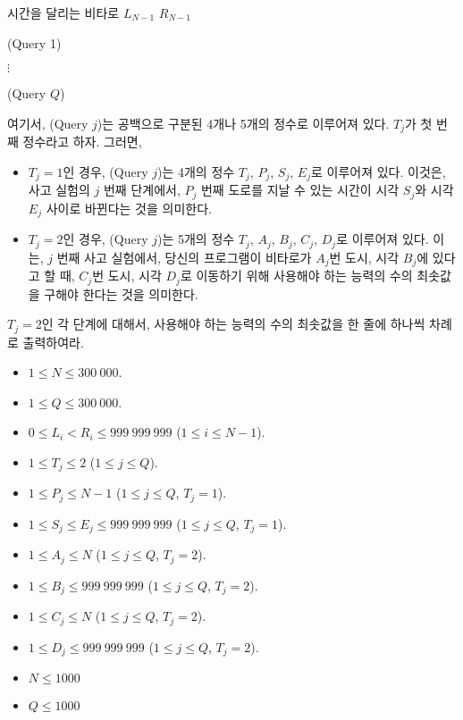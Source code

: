 \begin{problem}{시간을 달리는 비타로}
	$L_{N-1}$ $R_{N-1}$
	
	(Query 1)
	
	$\vdots$
	
	(Query $Q$)
	
	여기서, (Query $j$)는 공백으로 구분된 4개나 5개의 정수로 이루어져 있다. $T_j$가 첫 번째 정수라고 하자. 그러면,
	
	\begin{itemize}
		\item $T_j=1$인 경우, (Query $j$)는 4개의 정수 $T_j$, $P_j$, $S_j$, $E_j$로 이루어져 있다. 이것은, 사고 실험의 $j$ 번째 단계에서, $P_j$ 번째 도로를 지날 수 있는 시간이 시각 $S_j$와 시각 $E_j$ 사이로 바뀐다는 것을 의미한다.
		\item $T_j=2$인 경우, (Query $j$)는 5개의 정수 $T_j$, $A_j$, $B_j$, $C_j$, $D_j$로 이루어져 있다. 이는, $j$ 번째 사고 실험에서, 당신의 프로그램이 비타로가 $A_j$번 도시, 시각 $B_j$에 있다고 할 때, $C_j$번 도시, 시각 $D_j$로 이동하기 위해 사용해야 하는 능력의 수의 최솟값을 구해야 한다는 것을 의미한다.
	\end{itemize}
	
	\OutputFile
	
	$T_j=2$인 각 단계에 대해서, 사용해야 하는 능력의 수의 최솟값을 한 줄에 하나씩 차례로 출력하여라.
	
	\Constraints
	
	\begin{itemize}
		
		\item $1 \le N \le 300\ 000$.
		\item $1 \le Q \le 300\ 000$.
		\item $0 \le L_i < R_i \le 999\ 999\ 999$ ($1 \le i \le N-1$).
		\item $1 \le T_j \le 2$ ($1 \le j \le Q$).
		\item $1 \le P_j \le N-1$ ($1 \le j \le Q$, $T_j = 1$).
		\item $1 \le S_j \le E_j \le 999\ 999\ 999$ ($1 \le j \le Q$, $T_j = 1$).
		\item $1 \le A_j \le N$ ($1 \le j \le Q$, $T_j = 2$).
		\item $1 \le B_j \le 999\ 999\ 999$ ($1 \le j \le Q$, $T_j = 2$).
		\item $1 \le C_j \le N$ ($1 \le j \le Q$, $T_j = 2$).
		\item $1 \le D_j \le 999\ 999\ 999$ ($1 \le j \le Q$, $T_j = 2$).
		
	\end{itemize}
	
	
	\begin{itemize}
		\item $N \le 1000$
		\item $Q \le 1000$
	\end{itemize}
	

\end{problem}
